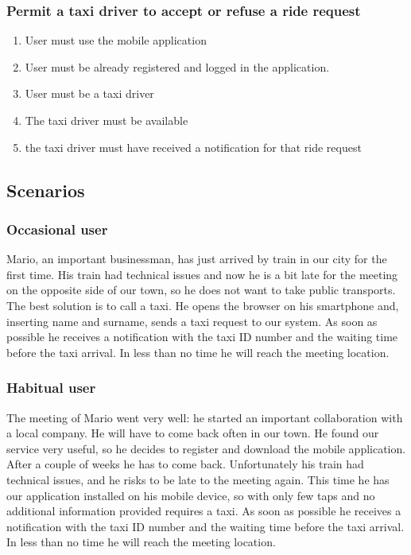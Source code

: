 		\subsubsection{Permit a taxi driver to accept or refuse a ride request}
			\begin{enumerate}[label=\bfseries R\arabic*:]
				\item User must use the mobile application
				\item User must be already registered and logged in the application.
				\item User must be a taxi driver
				\item The taxi driver must be available
				\item the taxi driver must have received a notification for that ride request
			\end{enumerate}
	\subsection{Scenarios}
		\subsubsection{Occasional user}
			Mario, an important businessman, has just arrived by train in our city for the first time.
			His train had technical issues and now he is a bit late for the meeting on 
			the opposite side of our town, so he does not want to take public transports.
			The best solution is to call a taxi.
			He opens the browser on his smartphone and, inserting name and surname, sends a taxi request
			to our system. As soon as possible he receives a notification with the taxi ID number and the
			waiting time before the taxi arrival. In less than no time he will reach the meeting location.
		\subsubsection{Habitual user}
			The meeting of Mario went very well: he started an important collaboration with a local
			company. He will have to come back often in our town. He found our service very useful, so
			he decides to register and download the mobile application. After a couple of weeks he has to
			come back. Unfortunately his train had technical issues, and he risks to be late to the
			meeting again. This time he has our application installed on his mobile device, so with only
			few taps and no additional information provided requires a taxi. As soon as possible he receives
			a notification with the taxi ID number and the	waiting time before the taxi arrival.
			In less than no time he will reach the meeting location.

